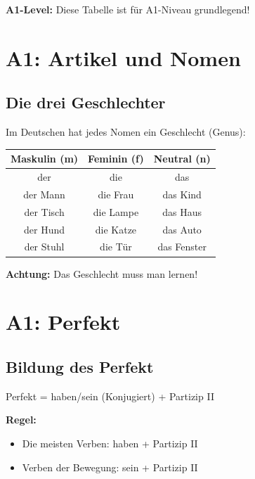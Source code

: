 \bigskip
\noindent\textbf{A1-Level:} Diese Tabelle ist für A1-Niveau grundlegend!

\chapterend

\chapter{A1: Artikel und Nomen}
\label{cha:A1ArtikelNomen}

\section{Die drei Geschlechter}

Im Deutschen hat jedes Nomen ein Geschlecht (Genus):

\begin{center}
\begin{tabular}{|c|c|c|}
\hline
Maskulin (m) & Feminin (f) & Neutral (n) \\ \hline
der & die & das \\ \hline
der Mann & die Frau & das Kind \\ \hline
der Tisch & die Lampe & das Haus \\ \hline
der Hund & die Katze & das Auto \\ \hline
der Stuhl & die Tür & das Fenster \\ \hline
\end{tabular}
\end{center}

\bigskip
\noindent\textbf{Achtung:} Das Geschlecht muss man lernen!

\chapterend

\chapter{A1: Perfekt}
\label{cha:A1Perfekt}

\section{Bildung des Perfekt}

Perfekt = haben/sein (Konjugiert) + Partizip II

\bigskip
\noindent\textbf{Regel:}
\begin{itemize}
    \item Die meisten Verben: haben + Partizip II
    \item Verben der Bewegung: sein + Partizip II
\end{itemize}

